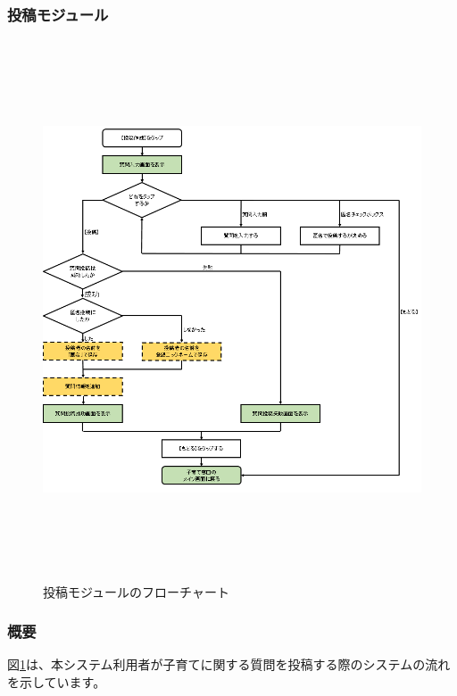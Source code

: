\documentclass[a4j]{jarticle}
\begin{document}
\subsubsection{投稿モジュール\label{投稿}} %
\begin{figure}[H]
    \begin{center}
      \includegraphics[width = 15cm, height = 16.0cm] {子育て窓口_投稿.png} %
    \caption {投稿モジュールのフローチャート}
    \label{子育て窓口_投稿}
    \end{center}
\end{figure}
\subsubsection*{概要}
図\ref{子育て窓口_投稿}は、本システム利用者が子育てに関する質問を投稿する際のシステムの流れを示しています。
\end{document}
